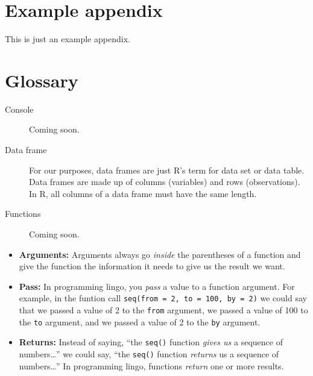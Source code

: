 \documentclass[
  letterpaper,
  DIV=11,
  numbers=noendperiod]{scrreprt}
\begin{document}
\cleardoublepage
{}
{}
\appendix

\chapter{Example appendix}\label{example-appendix}

This is just an example appendix.

\chapter{Glossary}\label{sec-glossary}

\begin{description}
\item[\label{glossary-console}{Console}]
Coming soon.
\item[\label{glossary-data-frame}{Data frame}]
For our purposes, data frames are just R's term for data set or data
table. Data frames are made up of columns (variables) and rows
(observations). In R, all columns of a data frame must have the same
length.
\item[\label{glossary-functions}{Functions}]
Coming soon.
\end{description}

\begin{itemize}
\item
  \textbf{Arguments:} Arguments always go \emph{inside} the parentheses
  of a function and give the function the information it needs to give
  us the result we want.
\item
  \textbf{Pass:} In programming lingo, you \emph{pass} a value to a
  function argument. For example, in the funtion call
  \texttt{seq(from\ =\ 2,\ to\ =\ 100,\ by\ =\ 2)} we could say that we
  passed a value of 2 to the \texttt{from} argument, we passed a value
  of 100 to the \texttt{to} argument, and we passed a value of 2 to the
  \texttt{by} argument.
\item
  \textbf{Returns:} Instead of saying, ``the \texttt{seq()} function
  \emph{gives us} a sequence of numbers\ldots{}'' we could say, ``the
  \texttt{seq()} function \emph{returns} us a sequence of
  numbers\ldots{}'' In programming lingo, functions \emph{return} one or
  more results.
\end{itemize}
\end{document}
